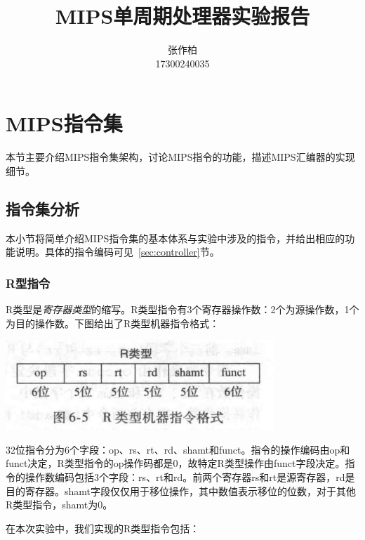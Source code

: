 \documentclass[twocolumn]{article} %
\title{\textbf{MIPS单周期处理器实验报告}}
\author{张作柏 \\17300240035}
\begin{document}
\begin{sloppypar}
\maketitle

\pagestyle{fancy}
\lhead{\textbf{{\thetitle}}}
\rhead{\textbf{\nouppercase{\firstleftmark}}}
\cfoot{\thepage}

\tableofcontents
\clearpage

\section{MIPS指令集}

本节主要介绍MIPS指令集架构，讨论MIPS指令的功能，描述MIPS汇编器的实现细节。

\subsection{指令集分析}

本小节将简单介绍MIPS指令集的基本体系与实验中涉及的指令，并给出相应的功能说明。具体的指令编码可见~\ref{sec:controller}节。

\subsubsection{R型指令}

R类型是{\em 寄存器类型}的缩写。R类型指令有3个寄存器操作数：2个为源操作数，1个为目的操作数。下图给出了R类型机器指令格式：

\includegraphics[width =0.9 \linewidth]{figure/Rtype.png}

32位指令分为6个字段：op、rs、rt、rd、shamt和funct。指令的操作编码由op和funct决定，R类型指令的op操作码都是0，故特定R类型操作由funct字段决定。指令的操作数编码包括3个字段：rs、rt和rd。前两个寄存器rs和rt是源寄存器，rd是目的寄存器。shamt字段仅仅用于移位操作，其中数值表示移位的位数，对于其他R类型指令，shamt为0。

在本次实验中，我们实现的R类型指令包括：


\end{sloppypar}
\end{document}
